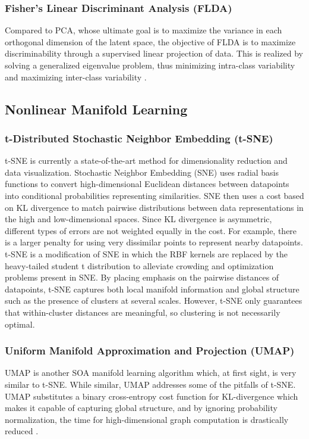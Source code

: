\documentclass[conference]{IEEEtran}
\begin{document}
	\subsubsection*{Fisher's Linear Discriminant Analysis (FLDA)}  Compared to PCA, whose ultimate goal is to maximize the variance in each orthogonal dimension of the latent space, the objective of FLDA is to maximize discriminability through a supervised linear projection of data.  This is realized by solving a generalized eigenvalue problem, thus minimizing intra-class variability and maximizing inter-class variability \cite{Murphy2012Textbook,Sugiyama2006FDASupDimRed}.
	
	
	\subsection{Nonlinear Manifold Learning}
	\subsubsection*{t-Distributed Stochastic Neighbor Embedding (t-SNE)} t-SNE is currently a state-of-the-art method for dimensionality reduction and data visualization. Stochastic Neighbor Embedding (SNE) uses radial basis functions  to convert high-dimensional Euclidean distances between datapoints into conditional probabilities representing similarities.  SNE then uses a cost based on KL divergence to match pairwise distributions between data representations in the high and low-dimensional spaces.  Since KL divergence is asymmetric, different types of errors are not weighted equally in the cost.  For example, there is a larger penalty for using very dissimilar points to represent nearby datapoints.  t-SNE is a modification of SNE in which the RBF kernels are replaced by the heavy-tailed student t distribution \cite{vanDerMaaten2008tSNE} to alleviate crowding and optimization problems present in SNE.  By placing emphasis on the pairwise distances of datapoints, t-SNE captures both local manifold information and global structure such as the presence of clusters at several scales. However, t-SNE only guarantees that within-cluster distances are meaningful, so clustering is not necessarily optimal.
	\subsubsection*{Uniform Manifold Approximation and Projection (UMAP)} UMAP is another SOA manifold learning algorithm which, at first sight, is very similar to t-SNE.  While similar, UMAP addresses some of the pitfalls of t-SNE.  UMAP substitutes a binary cross-entropy cost function for KL-divergence which makes it capable of capturing global structure, and by ignoring probability normalization, the time for high-dimensional graph computation is drastically reduced \cite{McInnes2018UMAP}.
\end{document}
